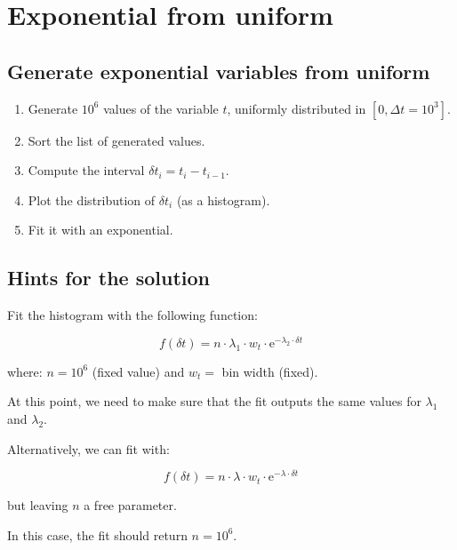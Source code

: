 

\section{Exponential from uniform}
\label{exer:expo_from_uniform}

\subsection{Generate exponential variables from uniform}

\begin{enumerate}
	\item Generate $10^{6}$ values of the variable $t$, uniformly distributed in $[0, \Delta t = 10^{3}]$.
	\item Sort the list of generated values.
	\item Compute the interval $\delta t_{i} = t_{i} - t_{i - 1}$.
	\item Plot the distribution of $\delta t_{i}$ (as a histogram).
	\item Fit it with an exponential. 
\end{enumerate}

\subsection{Hints for the solution}

Fit the histogram with the following function:

\begin{equation}
	f(\delta t) = n \cdot \lambda_{1} \cdot w_{t} \cdot \mathrm{e}^{- \lambda_{2} \cdot \delta t}
\end{equation}

where: $n = 10^{6}$ (fixed value) and $w_{t} = $ bin width (fixed).

At this point, we need to make sure that the fit outputs the same values for $\lambda_{1}$ and $\lambda_{2}$.

Alternatively, we can fit with:

\begin{equation}
	f(\delta t) = n \cdot \lambda \cdot w_{t} \cdot \mathrm{e}^{- \lambda \cdot \delta t}
\end{equation}

but leaving $n$ a free parameter.

In this case, the fit should return $n = 10^{6}$.

